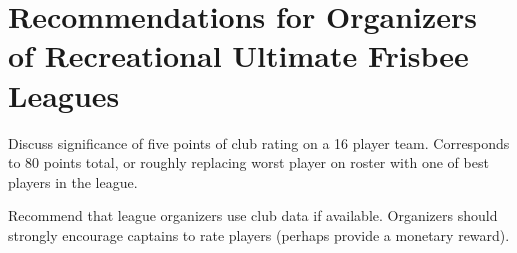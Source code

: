 \section{Recommendations for Organizers of Recreational Ultimate Frisbee Leagues}

Discuss significance of five points of club rating on a 16 player team.  Corresponds to 80 points total, or roughly replacing worst player on roster with one of best players in the league.

Recommend that league organizers use club data if available.  Organizers should strongly encourage captains to rate players (perhaps provide a monetary reward).
